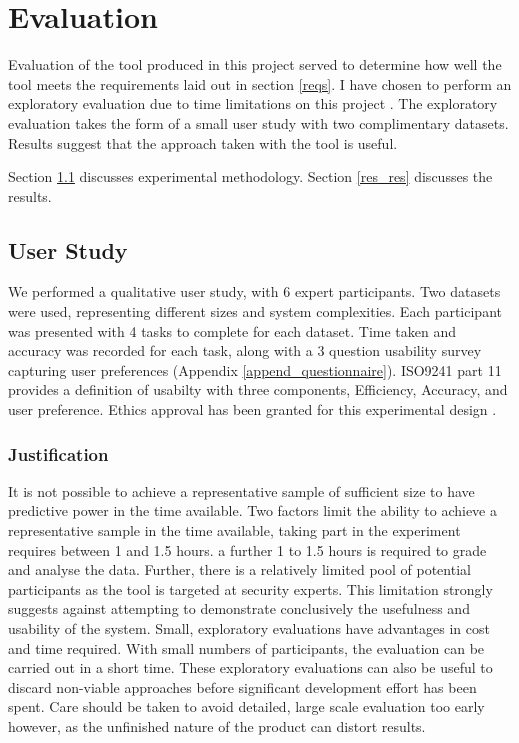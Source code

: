 \chapter{Evaluation}\label{eval}

Evaluation of the tool produced in this project served to determine how well the tool meets the requirements laid out in section \ref{reqs}. I have chosen to perform an exploratory evaluation due to time limitations on this project \cite{Ellis:2006:EAU:1168149.1168152}. The exploratory evaluation takes the form of a small user study with two complimentary datasets. Results suggest that the approach taken with the tool is useful. 

Section \ref{res_study} discusses experimental methodology. Section \ref{res_res} discusses the results. 

\section{User Study}\label{res_study}

We performed a qualitative user study, with 6 expert participants. Two datasets were used, representing different sizes and system complexities. Each participant was presented with 4 tasks to complete for each dataset. Time taken and accuracy was recorded for each task, along with a 3 question usability survey capturing user preferences (Appendix \ref{append_questionnaire}). ISO9241 part 11 \cite{iso9241} provides a definition of usabilty with three components, Efficiency, Accuracy, and user preference. 
Ethics approval has been granted for this experimental design \cite{leliel2013ethics}. 

\subsection{Justification}
It is not possible to achieve a representative sample of sufficient size to have predictive power in the time available. Two factors limit the ability to achieve a representative sample in the time available, taking part in the experiment requires between 1 and 1.5 hours. a further 1 to 1.5 hours is required to grade and analyse the data. Further, there is a relatively limited pool of potential participants as the tool is targeted at security experts. This limitation strongly suggests against attempting to demonstrate conclusively the usefulness and usability of the system. Small, exploratory evaluations have advantages in cost and time required. With small numbers of participants, the evaluation can be carried out in a short time. These exploratory evaluations can also be useful to discard non-viable approaches before significant development effort has been spent. Care should be taken to avoid detailed, large scale evaluation too early however, as the unfinished nature of the product can distort results. 

